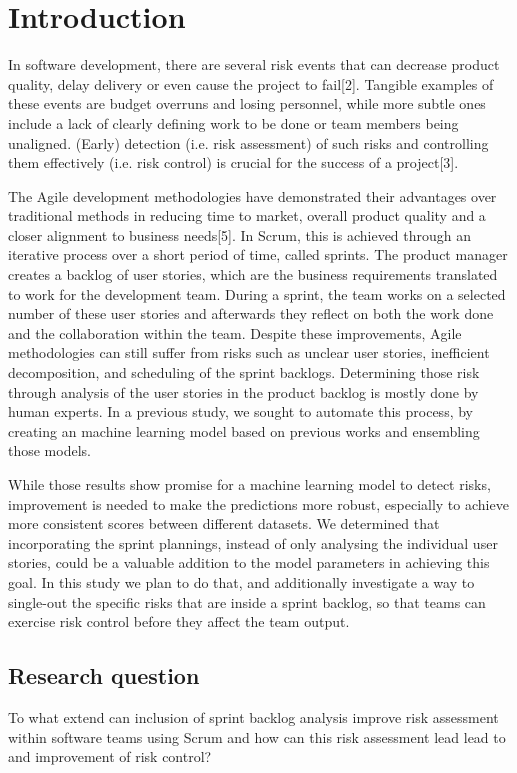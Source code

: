 \documentclass[sigconf]{acmart}
\begin{document}
\section{Introduction}
In software development, there are several risk events that can decrease product quality, delay delivery or even cause the project to fail[2]. 
Tangible examples of these events are budget overruns and losing personnel, while more subtle ones include a lack of clearly defining work to be done or team members being unaligned. 
(Early) detection (i.e. risk assessment) of such risks and controlling them effectively (i.e. risk control) is crucial for the success of a project[3].

The Agile development methodologies have demonstrated their advantages over traditional methods in reducing time to market, overall product quality and a closer alignment to business needs[5]. 
In Scrum, this is achieved through an iterative process over a short period of time, called sprints. The product manager creates a backlog of user stories, which are the business requirements translated to work for the development team. 
During a sprint, the team works on a selected number of these user stories and afterwards they reflect on both the work done and the collaboration within the team.
Despite these improvements, Agile methodologies can still suffer from risks such as unclear user stories, inefficient decomposition, and scheduling of the sprint backlogs. 
Determining those risk through analysis of the user stories in the product backlog is mostly done by human experts. 
In a previous study, we sought to automate this process, by creating an machine learning model based on previous works and ensembling those models. 

While those results show promise for a machine learning model to detect risks, improvement is needed to make the predictions more robust, especially to achieve more consistent scores between different datasets.
We determined that incorporating the sprint plannings, instead of only analysing the individual user stories, could be a valuable addition to the model parameters in achieving this goal. In this study we plan to do that, and additionally investigate a way to single-out the specific risks that are inside a sprint backlog, so that teams can exercise risk control before they affect the team output.

\subsection{Research question}
To what extend can inclusion of sprint backlog analysis improve risk assessment within software teams using Scrum and how can this risk assessment lead lead to and improvement of risk control?
\end{document}
